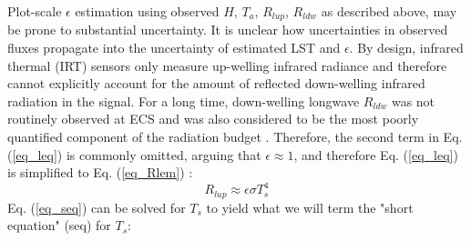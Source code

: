 \documentclass[fleqn,10pt]{wlscirep}
\begin{document}
Plot-scale $\epsilon$ estimation using observed $H$, $T_{a}$, $R_{lup}$, $R_{ldw}$ as described above, may be prone to substantial uncertainty. It is unclear how uncertainties in observed fluxes propagate into the uncertainty of estimated LST and $\epsilon$. By design, infrared thermal (IRT) sensors only measure up-welling infrared radiance and therefore cannot explicitly account for the amount of reflected down-welling infrared radiation in the signal. For a long time, down-welling longwave $R_{ldw}$ was not routinely observed at ECS \cite{wang_evaluation_2009-1} and was also considered to be the most poorly quantified component of the radiation budget \cite{trenberth2012tracking}. Therefore, the second term in Eq. (\ref{eq_leq}) is commonly omitted, arguing that $\epsilon\approx 1$, and therefore Eq. (\ref{eq_leq}) is simplified to Eq. (\ref{eq_Rlem}) \cite{crago_use_2014-3}:
\begin{equation}\label{eq_seq}
R_{lup} \approx \epsilon \sigma T_{s}^{4}
\end{equation} 
Eq. (\ref{eq_seq}) can be solved for $T_s$ to yield what we will term the "short equation" (seq) for $T_s$:
\end{document}
